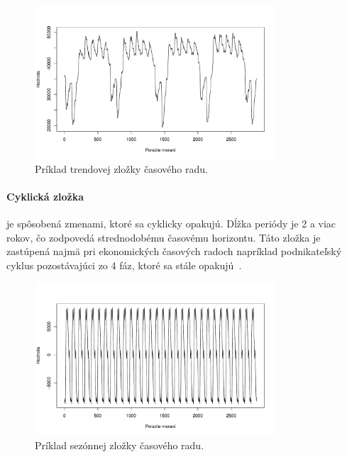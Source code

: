\documentclass[a4paper,slovak,12pt,appendix]{article}
\begin{document}
\begin{figure}[!ht]
  \centering
  \includegraphics[width=0.8\textwidth]{trend_component.pdf}
  \caption{Príklad trendovej zložky časového radu.}
  \label{fig-trend-comp}
\end{figure}

\paragraph{Cyklická zložka} je spôsobená zmenami, ktoré sa cyklicky opakujú.
Dĺžka periódy je 2 a viac rokov, čo zodpovedá strednodobému časovému horizontu.
Táto zložka je zastúpená najmä pri ekonomických časových radoch napríklad
podnikateľský cyklus pozostávajúci zo 4 fáz, ktoré sa stále
opakujú~\cite{Agrawal2013}.

\begin{figure}[H]
  \centering
  \includegraphics[width=0.8\textwidth]{season_component.pdf}
  \caption{Príklad sezónnej zložky časového radu.}
  \label{fig-season-comp}
\end{figure}
\end{document}
